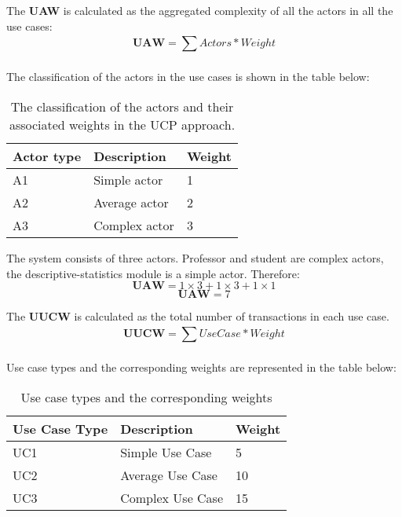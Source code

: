 \documentclass[12pt]{article}
\begin{document}
The \textbf{UAW} is calculated as the aggregated complexity of all the actors in all the use cases:
\begin{equation}
    \textbf{UAW} = \sum^{}_{}{Actors * Weight}
\end{equation}\par 
The classification of the actors in the use cases is shown in the table below:
\begin{table}[h]
\centering
\begin{tabular}{|l|l|l|}
\hline
\textbf{Actor type} & \textbf{Description} & \textbf{Weight} \\ \hline
A1                  & Simple actor         & 1               \\ \hline
A2                  & Average actor        & 2               \\ \hline
A3                  & Complex actor        & 3               \\ \hline
\end{tabular}
\caption{The classification of the actors and their associated weights in the UCP approach.}
\end{table} \par
The system consists of three actors. Professor and student are complex actors, the descriptive-statistics module is a simple actor. Therefore:
\begin{equation}
    \textbf{UAW} = 1\times3 + 1\times3 + 1\times1
\end{equation}
\begin{equation}
    \textbf{UAW} = 7
\end{equation}

The \textbf{UUCW} is calculated as the total number of transactions in each use case.
\begin{equation}
    \textbf{UUCW} = \sum^{}_{}{UseCase * Weight}
\end{equation}
\par Use case types and the corresponding weights are represented in the table below:
\begin{table}[h]
\centering
\begin{tabular}{|l|l|l|}
\hline
\textbf{Use Case Type} & \textbf{Description} & \textbf{Weight} \\ \hline
UC1                    & Simple Use Case      & 5               \\ \hline
UC2                    & Average Use Case     & 10              \\ \hline
UC3                    & Complex Use Case     & 15              \\ \hline
\end{tabular}
\caption{Use case types and the corresponding weights}
\end{table}\\ 
\end{document}
